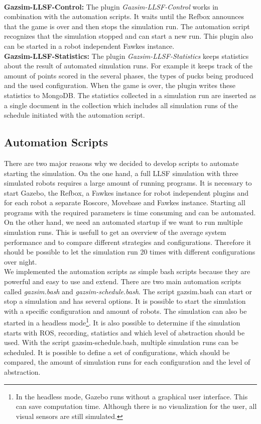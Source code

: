 \\
\textbf{Gazsim-LLSF-Control:}
The plugin \textit{Gazsim-LLSF-Control} works in combination with the automation scripts. It waits until the Refbox announces that the game is over and then stops the simulation run. The automation script recognizes that the simulation stopped and can start a new run. This plugin also can be started in a robot independent Fawkes instance.
\\
\textbf{Gazsim-LLSF-Statistics:}
The plugin \textit{Gazsim-LLSF-Statistics} keeps statistics about the result of automated simulation runs. For example it keeps track of the amount of points scored in the several phases, the types of pucks being produced and the used configuration. When the game is over, the plugin writes these statistics to MongoDB. The statistics collected in a simulation run are inserted as a single document in the collection which includes all simulation runs of the schedule initiated with the automation script.



\subsection{Automation Scripts}
There are two major reasons why we decided to develop scripts to automate starting the simulation. On the one hand, a full LLSF simulation with three simulated robots requires a large amount of running programs. It is necessary to start Gazebo, the Refbox, a Fawkes instance for robot independent plugins and for each robot a separate Roscore, Movebase and Fawkes instance. Starting all programs with the required parameters is time consuming and can be automated. On the other hand, we need an automated startup if we want to run multiple simulation runs. This is usefull to get an overview of the average system performance and to compare different strategies and configurations. Therefore it should be possible to let the simulation run 20 times with different configurations over night.\\
We implemented the automation scripts as simple bash scripts because they are powerful and easy to use and extend. There are two main automation scripts called \textit{gazsim.bash} and \textit{gazsim-schedule.bash}. The script gazsim.bash can start or stop a simulation and has several options. It is possible to start the simulation with a specific configuration and amount of robots. The simulation can also be started in a headless mode\footnote{In the headless mode, Gazebo runs without a graphical user interface. This can save computation time. Although there is no visualization for the user, all visual sensors are still simulated.}. It is also possible to determine if the simulation starts with ROS, recording, statistics and which level of abstraction should be used. With the script gazsim-schedule.bash, multiple simulation runs can be scheduled. It is possible to define a set of configurations, which should be compared, the amount of simulation runs for each configuration and the level of abstraction.

